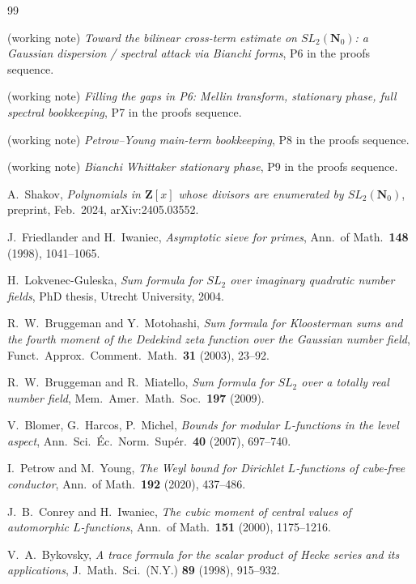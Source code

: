 \documentclass[11pt]{article}
\theoremstyle{definition}
\newcommand{\Nz}{\mathbf{N}_0}
\newcommand{\Z}{\mathbf{Z}}
\newcommand{\SLNz}{SL_2(\Nz)}
\begin{document}
\bigskip

\begin{thebibliography}{99}

 (working note) \emph{Toward the bilinear cross-term estimate on $\SLNz$: a Gaussian dispersion / spectral attack via Bianchi forms}, P6 in the proofs sequence.

 (working note) \emph{Filling the gaps in P6: Mellin transform, stationary phase, full spectral bookkeeping}, P7 in the proofs sequence.

 (working note) \emph{Petrow--Young main-term bookkeeping}, P8 in the proofs sequence.

 (working note) \emph{Bianchi Whittaker stationary phase}, P9 in the proofs sequence.

 A.~Shakov, \emph{Polynomials in $\Z[x]$ whose divisors are enumerated by $\SLNz$}, preprint, Feb.\ 2024, arXiv:2405.03552.

 J.~Friedlander and H.~Iwaniec, \emph{Asymptotic sieve for primes}, Ann.\ of Math.\ \textbf{148} (1998), 1041--1065.

 H.~Lokvenec-Guleska, \emph{Sum formula for $SL_2$ over imaginary quadratic number fields}, PhD thesis, Utrecht University, 2004.

 R.~W.~Bruggeman and Y.~Motohashi, \emph{Sum formula for Kloosterman sums and the fourth moment of the Dedekind zeta function over the Gaussian number field}, Funct.\ Approx.\ Comment.\ Math.\ \textbf{31} (2003), 23--92.

 R.~W.~Bruggeman and R.~Miatello, \emph{Sum formula for $SL_2$ over a totally real number field}, Mem.\ Amer.\ Math.\ Soc.\ \textbf{197} (2009).

 V.~Blomer, G.~Harcos, P.~Michel, \emph{Bounds for modular $L$-functions in the level aspect}, Ann.\ Sci.\ \'Ec.\ Norm.\ Sup\'er.\ \textbf{40} (2007), 697--740.

 I.~Petrow and M.~Young, \emph{The Weyl bound for Dirichlet $L$-functions of cube-free conductor}, Ann.\ of Math.\ \textbf{192} (2020), 437--486.

 J.~B.~Conrey and H.~Iwaniec, \emph{The cubic moment of central values of automorphic $L$-functions}, Ann.\ of Math.\ \textbf{151} (2000), 1175--1216.

 V.~A.~Bykovsky, \emph{A trace formula for the scalar product of Hecke series and its applications}, J.\ Math.\ Sci.\ (N.Y.) \textbf{89} (1998), 915--932.


\end{thebibliography}
\end{document}
